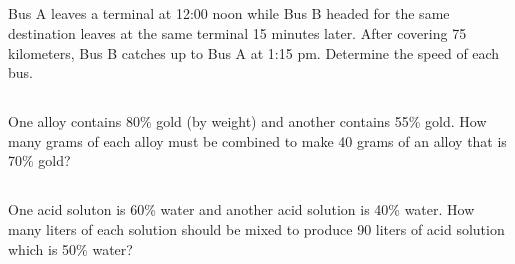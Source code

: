 \subsection{}  Bus A leaves a terminal at 12:00 noon while Bus B headed for the same destination
	leaves at the same terminal 15 minutes later. After covering 75 kilometers, Bus B catches up
	to Bus A at 1:15 pm. Determine the speed of each bus.

\subsection{} One alloy contains 80\% gold (by weight) and another contains 55\% gold. How many grams of
	each alloy must be combined to make 40 grams of an alloy that is 70\% gold?

\subsection{} One acid soluton is 60\% water and another acid solution is 40\% water. How many liters of each
	solution should be mixed to produce 90 liters of acid solution which is 50\% water?
